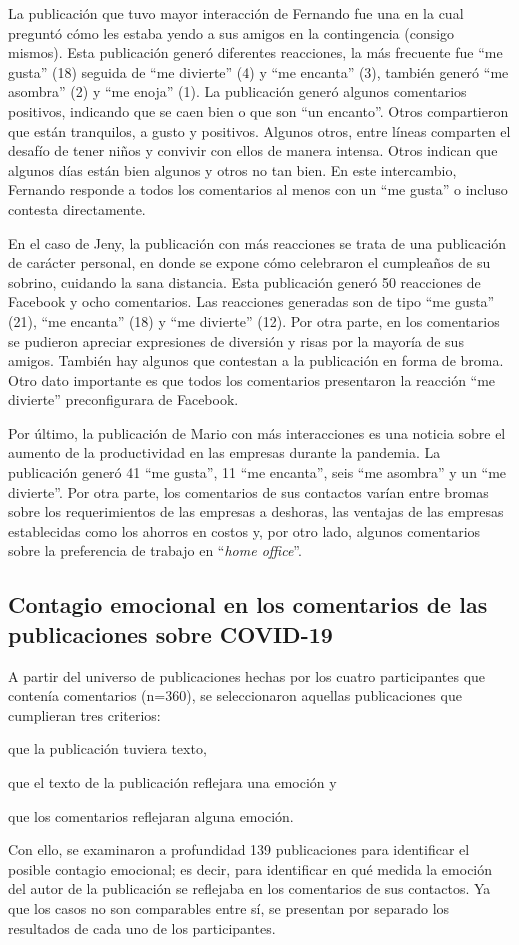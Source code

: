 \documentclass[spanish]{textolivre}
\begin{document}
La publicación que tuvo mayor interacción de Fernando fue una en la cual preguntó cómo les estaba yendo a sus amigos en la contingencia (consigo mismos). Esta publicación generó diferentes reacciones, la más frecuente fue “me gusta” (18) seguida de “me divierte” (4) y “me encanta” (3), también generó “me asombra” (2) y “me enoja” (1). La publicación generó algunos comentarios positivos, indicando que se caen bien o que son “un encanto”. Otros compartieron que están tranquilos, a gusto y positivos. Algunos otros, entre líneas comparten el desafío de tener niños y convivir con ellos de manera intensa. Otros indican que algunos días están bien algunos y otros no tan bien. En este intercambio, Fernando responde a todos los comentarios al menos con un “me gusta” o incluso contesta directamente. 

En el caso de Jeny, la publicación con más reacciones se trata de una publicación de carácter personal, en donde se expone cómo celebraron el cumpleaños de su sobrino, cuidando la sana distancia. Esta publicación generó 50 reacciones de Facebook y ocho comentarios. Las reacciones generadas son de tipo “me gusta” (21), “me encanta” (18) y “me divierte” (12). Por otra parte, en los comentarios se pudieron apreciar expresiones de diversión y risas por la mayoría de sus amigos. También hay algunos que contestan a la publicación en forma de broma. Otro dato importante es que todos los comentarios presentaron la reacción “me divierte” preconfigurara de Facebook. 

Por último, la publicación de Mario con más interacciones es una noticia sobre el aumento de la productividad en las empresas durante la pandemia. La publicación generó 41 “me gusta”, 11 “me encanta”, seis “me asombra” y un “me divierte”. Por otra parte, los comentarios de sus contactos varían entre bromas sobre los requerimientos de las empresas a deshoras, las ventajas de las empresas establecidas como los ahorros en costos y, por otro lado, algunos comentarios sobre la preferencia de trabajo en “\textit{home office}”. 


\subsection{Contagio emocional en los comentarios de las publicaciones sobre COVID-19}
A partir del universo de publicaciones hechas por los cuatro participantes que contenía comentarios (n=360), se seleccionaron aquellas publicaciones que cumplieran tres criterios: 
\begin{enumerate*}[label=\arabic*)]
\item que la publicación tuviera texto, 
\item que el texto de la publicación reflejara una emoción y 
\item que los comentarios reflejaran alguna emoción.
\end{enumerate*}
Con ello, se examinaron a profundidad 139 publicaciones para identificar el posible contagio emocional; es decir, para identificar en qué medida la emoción del autor de la publicación se reflejaba en los comentarios de sus contactos.  Ya que los casos no son comparables entre sí, se presentan por separado los resultados de cada uno de los participantes. 
\end{document}
